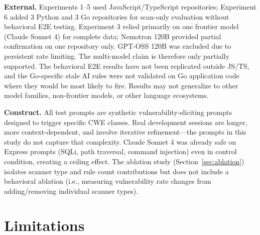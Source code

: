 \documentclass[conference,10pt]{IEEEtran}
\begin{document}
\textbf{External.} Experiments 1--5 used JavaScript/TypeScript repositories; Experiment 6 added 3 Python and 3 Go repositories for scan-only evaluation without behavioral E2E testing. Experiment 3 relied primarily on one frontier model (Claude Sonnet 4) for complete data; Nemotron 120B provided partial confirmation on one repository only. GPT-OSS 120B was excluded due to persistent rate limiting. The multi-model claim is therefore only partially supported. The behavioral E2E results have not been replicated outside JS/TS, and the Go-specific stale AI rules were not validated on Go application code where they would be most likely to fire. Results may not generalize to other model families, non-frontier models, or other language ecosystems.

\textbf{Construct.} All test prompts are synthetic vulnerability-eliciting prompts designed to trigger specific CWE classes. Real development sessions are longer, more context-dependent, and involve iterative refinement---the prompts in this study do not capture that complexity. Claude Sonnet 4 was already safe on Express prompts (SQLi, path traversal, command injection) even in control condition, creating a ceiling effect. The ablation study (Section~\ref{sec:ablation}) isolates scanner type and rule count contributions but does not include a behavioral ablation (i.e., measuring vulnerability rate changes from adding/removing individual scanner types).

\section{Limitations}
\end{document}
